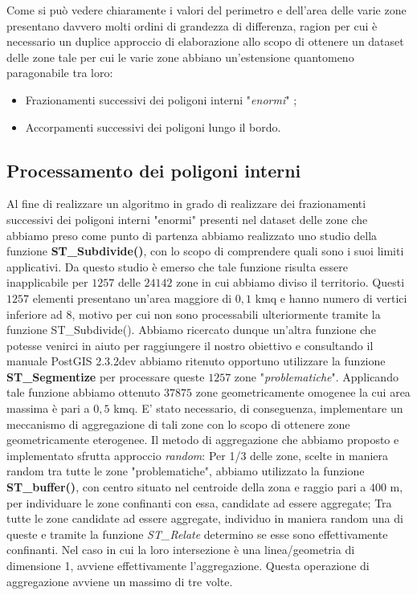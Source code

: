 Come si può vedere chiaramente i valori del perimetro e dell'area delle varie zone presentano davvero molti ordini di grandezza di differenza, ragion per cui è necessario un duplice approccio di elaborazione allo scopo di ottenere un dataset delle zone tale per cui le varie zone abbiano un'estensione quantomeno paragonabile tra loro:
\begin{itemize}
\item Frazionamenti successivi dei poligoni interni "\textit{enormi}" ;
\item Accorpamenti successivi dei poligoni lungo il bordo.
\end{itemize}
\subsection{Processamento dei poligoni interni}
Al fine di realizzare un algoritmo in grado di realizzare dei frazionamenti successivi dei poligoni interni "enormi" presenti nel dataset delle zone che abbiamo preso come punto di partenza abbiamo realizzato uno studio della funzione \textbf{ST\_Subdivide()}, con lo scopo di comprendere quali sono i suoi limiti applicativi. Da questo studio è emerso che tale funzione risulta essere inapplicabile per $1257$ delle $24142$ zone in cui abbiamo diviso il territorio. Questi $1257$ elementi presentano un'area maggiore di $0,1$ kmq e hanno numero di vertici inferiore ad $8$, motivo per cui non sono processabili ulteriormente tramite la funzione ST\_Subdivide().\newline
Abbiamo ricercato dunque un'altra funzione che potesse venirci in aiuto per raggiungere il nostro obiettivo e consultando il manuale PostGIS 2.3.2dev abbiamo ritenuto opportuno utilizzare la funzione \textbf{ST\_Segmentize} per processare queste $1257$ zone "\textit{problematiche}". Applicando tale funzione abbiamo ottenuto $37875$ zone geometricamente omogenee la cui area massima è pari a $0,5$ kmq. E' stato necessario, di conseguenza, implementare un meccanismo di aggregazione di tali zone con lo scopo di ottenere zone geometricamente eterogenee. Il metodo di aggregazione che abbiamo proposto e implementato sfrutta approccio \textit{random}: \newline
Per 1/3 delle zone, scelte in maniera random tra tutte le zone "problematiche", abbiamo utilizzato la funzione \textbf{ST\_buffer()}, con centro situato nel centroide della zona e raggio pari a $400$ m, per individuare le zone confinanti con essa, candidate ad essere aggregate; Tra tutte le zone candidate ad essere aggregate, individuo in maniera random una di queste e tramite la funzione \textit{ST\_Relate} determino se esse sono effettivamente confinanti. Nel caso in cui la loro intersezione è una linea/geometria di dimensione 1, avviene effettivamente l'aggregazione. Questa operazione di aggregazione avviene un massimo di tre volte.
